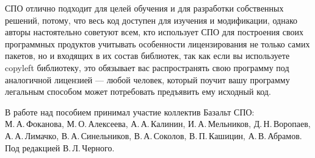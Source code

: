 СПО отлично подходит для целей обучения и для разработки собственных решений, потому, что весь 
код доступен для изучения и модификации, однако авторы настоятельно советуют всем, кто использует 
СПО для построения своих программных продуктов учитывать особенности лицензирования не только самих 
пакетов, но и входящих в их состав библиотек, так как если вы используете copyleft библиотеку, 
это обязывает вас распространять свою программу под аналогичной лицензией --- любой человек, который 
поучит вашу программу легальным способом может потребовать предъявить ему исходный код.

В работе над пособием принимал участие коллектив Базальт СПО:\\
М.\,А.\,Фоканова, М.\,О.\,Алексеева, А.\,А.\,Калинин, И.\,А.\,Мельников, Д.\,Н.\,Воропаев, А.\,А.\,Лимачко, В.\,А.\,Синельников, В.\,А.\,Соколов, В.\,П.\,Кашицин, А.\,В.\,Абрамов. Под редакцией В.\,Л.\,Черного. 

